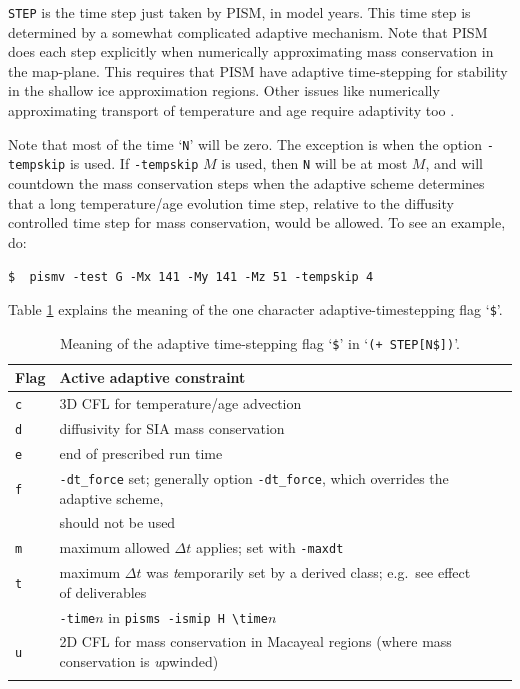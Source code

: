 \documentclass[11pt,final]{amsart}
\begin{document}
\verb|STEP| is the time step just taken by PISM, in model years.  This time step is determined by a somewhat complicated adaptive mechanism.  Note that PISM does each step explicitly when numerically approximating mass conservation in the map-plane.  This requires that PISM have adaptive time-stepping for stability in the shallow ice approximation regions.  Other issues like numerically approximating transport of temperature and age require adaptivity too \cite{BBL}.

Note that most of the time `\verb|N|' will be zero.  The exception is when the option \verb|-tempskip| is used.  If \verb|-tempskip| $M$ is used, then \verb|N| will be at most $M$, and will countdown the mass conservation steps when the adaptive scheme determines that a long temperature/age evolution time step, relative to the diffusity controlled time step for mass conservation, would be allowed.  To see an example, do: 

\verb|$  pismv -test G -Mx 141 -My 141 -Mz 51 -tempskip 4|

Table \ref{tab:adaptiveflag} explains the meaning of the one character adaptive-timestepping flag `\verb|$|'.

\begin{table}[h]
\caption{Meaning of the adaptive time-stepping flag `\texttt{\$}' in `\texttt{(+    STEP[N\$])}'.}\label{tab:adaptiveflag}
\begin{tabular}{@{}llll}\hline
\textbf{Flag} & \textbf{Active adaptive constraint} \\ \hline
\verb|c| & 3D CFL for temperature/age advection \cite{BBL} \\
\verb|d| & diffusivity for SIA mass conservation \cite{BBL} \\
\verb|e| & end of prescribed run time \\
\verb|f| & \verb|-dt_force| set; generally option \verb|-dt_force|, which overrides the adaptive scheme, \\
 & should not be used  \\
\verb|m| & maximum allowed $\Delta t$ applies; set with \verb|-maxdt| \\
\verb|t| & maximum $\Delta t$ was \emph{t}emporarily set by a derived class; e.g.~see effect of deliverables \\
 & \verb|-time|$n$ in \verb|pisms -ismip H \time|$n$ \\
\verb|u| & 2D CFL for mass conservation in Macayeal regions (where mass conservation is \emph{u}pwinded)\\
\hline
\normalsize
\end{tabular}
\end{table}
\end{document}
